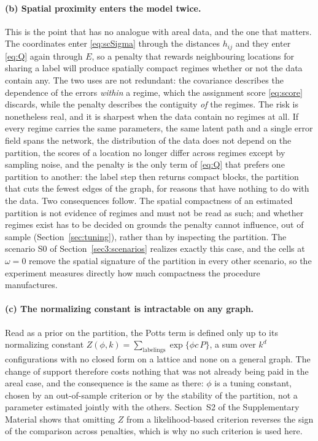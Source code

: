 \paragraph{(b) Spatial proximity enters the model twice.} This is the point that has no analogue with areal data, and the one that matters. The coordinates enter \eqref{eq:scSigma} through the distances $h_{ij}$ and they enter \eqref{eq:Q} again through $E$, so a penalty that rewards neighbouring locations for sharing a label will produce spatially compact regimes whether or not the data contain any. The two uses are not redundant: the covariance describes the dependence of the errors \emph{within} a regime, which the assignment score \eqref{eq:score} discards, while the penalty describes the contiguity \emph{of} the regimes. The risk is nonetheless real, and it is sharpest when the data contain no regimes at all. If every regime carries the same parameters, the same latent path and a single error field spans the network, the distribution of the data does not depend on the partition, the scores of a location no longer differ across regimes except by sampling noise, and the penalty is the only term of \eqref{eq:Q} that prefers one partition to another: the label step then returns compact blocks, the partition that cuts the fewest edges of the graph, for reasons that have nothing to do with the data. Two consequences follow. The spatial compactness of an estimated partition is not evidence of regimes and must not be read as such; and whether regimes exist has to be decided on grounds the penalty cannot influence, out of sample (Section~\ref{sec:tuning}), rather than by inspecting the partition. The scenario S0 of Section~\ref{sec3:scenarios} realizes exactly this case, and the cells at $\omega = 0$ remove the spatial signature of the partition in every other scenario, so the experiment measures directly how much compactness the procedure manufactures.

\paragraph{(c) The normalizing constant is intractable on any graph.} Read as a prior on the partition, the Potts term is defined only up to its normalizing constant $Z(\phi,k) = \sum_{\text{labelings}}\exp\{\phi c\,P\}$, a sum over $k^d$ configurations with no closed form on a lattice and none on a general graph. The change of support therefore costs nothing that was not already being paid in the areal case, and the consequence is the same as there: $\phi$ is a tuning constant, chosen by an out-of-sample criterion or by the stability of the partition, not a parameter estimated jointly with the others. Section~S2 of the Supplementary Material shows that omitting $Z$ from a likelihood-based criterion reverses the sign of the comparison across penalties, which is why no such criterion is used here.

